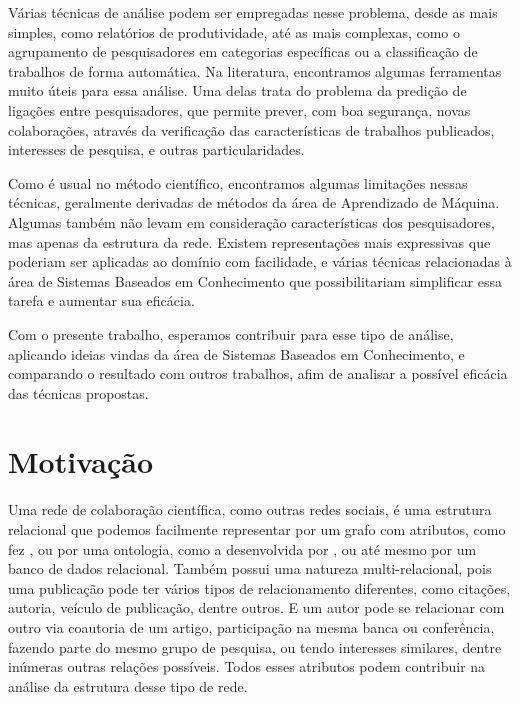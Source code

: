 Várias técnicas de análise podem ser empregadas nesse problema, desde as mais simples, como relatórios de produtividade, até as mais complexas, como o agrupamento de pesquisadores em categorias específicas ou a classificação de trabalhos de forma automática. Na literatura, encontramos algumas ferramentas muito úteis para essa análise. Uma delas trata do problema da predição de ligações entre pesquisadores, que permite prever, com boa segurança, novas colaborações, através da verificação das características de trabalhos publicados, interesses de pesquisa, e outras particularidades.

Como é usual no método científico, encontramos algumas limitações nessas técnicas, geralmente derivadas de métodos da área de Aprendizado de Máquina. Algumas também não levam em consideração características dos pesquisadores, mas apenas da estrutura da rede. Existem representações mais expressivas que poderiam ser aplicadas ao domínio com facilidade, e várias técnicas relacionadas à área de Sistemas Baseados em Conhecimento que possibilitariam simplificar essa tarefa e aumentar sua eficácia.


Com o presente trabalho, esperamos contribuir para esse tipo de análise, aplicando ideias vindas da área de Sistemas Baseados em Conhecimento, e comparando o resultado com outros trabalhos, afim de analisar a possível eficácia das técnicas propostas.

\section{Motivação}
\label{sec:motivacao}

Uma rede de colaboração científica, como outras redes sociais, é uma estrutura relacional que podemos facilmente representar por um grafo com atributos, como fez \citet{Cervantes2014}, ou por uma ontologia, como a desenvolvida por \citet{Anaue2009}, ou até mesmo por um banco de dados relacional. Também possui uma natureza multi-relacional, pois uma publicação pode ter vários tipos de relacionamento diferentes, como citações, autoria, veículo de publicação, dentre outros. E um autor pode se relacionar com outro via coautoria de um artigo, participação na mesma banca ou conferência, fazendo parte do mesmo grupo de pesquisa, ou tendo interesses similares, dentre inúmeras outras relações possíveis. Todos esses atributos podem contribuir na análise da estrutura desse tipo de rede.

